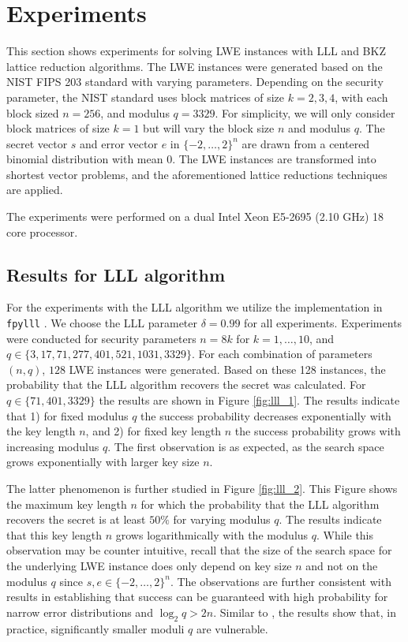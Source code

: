 \section{Experiments}
\label{sec:Experiments}

This section shows experiments for solving LWE instances with LLL and BKZ lattice reduction algorithms. The LWE instances were generated based on the NIST FIPS 203 standard with varying parameters. Depending on the security parameter, the NIST standard uses block matrices of size $k=2,3,4$, with each block sized $n = 256$, and modulus $q=3329$. For simplicity, we will only consider block matrices of size $k=1$ but will vary the block size $n$ and modulus $q$. The secret vector $s$ and error vector $e$ in $\{-2,\dotsc,2\}^n$ are drawn from a centered binomial distribution with mean $0$. The LWE instances are transformed into shortest vector problems, and the aforementioned lattice reductions techniques are applied.

The experiments were performed on a dual Intel Xeon E5-2695 (2.10 GHz) 18 core processor.

\subsection{Results for LLL algorithm}
\label{sec:Experiments:LLL}

For the experiments with the LLL algorithm we utilize the implementation in \texttt{fpylll} \cite{FPYLLL}. We choose the LLL parameter $\delta=0.99$ for all experiments. Experiments were conducted for security parameters $n=8k$ for $k=1,\dotsc,10$, and $q\in\{3,17,71,277,401,521,1031,3329\}$. For each combination of parameters $(n, q)$, $128$ LWE instances were generated. Based on these 128 instances, the probability that the LLL algorithm recovers the secret was calculated. For $q\in\{71,401,3329\}$ the results are shown in Figure \ref{fig:lll_1}. The results indicate that 1) for fixed modulus $q$ the success probability decreases exponentially with the key length $n$, and 2) for fixed key length $n$ the success probability grows with increasing modulus $q$. The first observation is as expected, as the search space grows exponentially with larger key size $n$.

The latter phenomenon is further studied in Figure \ref{fig:lll_2}. This Figure shows the maximum key length $n$ for which the probability that the LLL algorithm recovers the secret is at least $50\%$ for varying modulus $q$. The results indicate that this key length $n$ grows logarithmically with the modulus $q$. While this observation may be counter intuitive, recall that the size of the search space for the underlying LWE instance does only depend on key size $n$ and not on the modulus $q$ since $s,e\in\{-2,\dotsc,2\}^n$. The observations are further consistent with results in \cite{Laine15} establishing that success can be guaranteed with high probability for narrow error distributions and $\log_2 q>2n$. Similar to \cite{Laine15}, the results show that, in practice, significantly smaller moduli $q$ are vulnerable.

